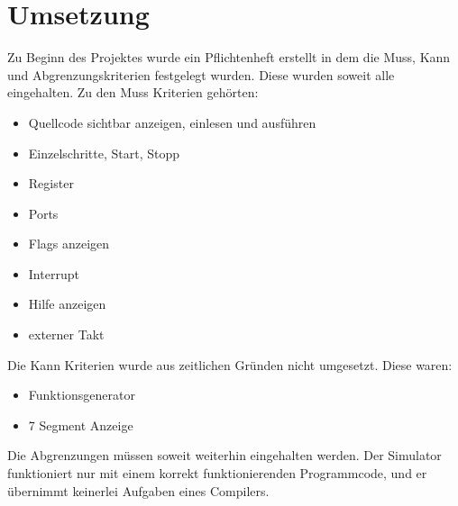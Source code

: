 \section{Umsetzung}
Zu Beginn des Projektes wurde ein Pflichtenheft erstellt in dem die Muss, Kann und Abgrenzungskriterien festgelegt wurden. Diese wurden soweit alle eingehalten. Zu den Muss Kriterien gehörten:
\begin{itemize}
\item Quellcode sichtbar anzeigen, einlesen und ausführen
\item Einzelschritte, Start, Stopp
\item Register
\item Ports
\item Flags anzeigen
\item Interrupt 
\item Hilfe anzeigen 
\item externer Takt 
\end{itemize}

\noindent Die Kann Kriterien wurde aus zeitlichen Gründen nicht umgesetzt. Diese waren:
\begin{itemize}
\item Funktionsgenerator 
\item 7 Segment Anzeige
\end{itemize}

\noindent Die Abgrenzungen müssen soweit weiterhin eingehalten werden. Der Simulator funktioniert nur mit einem korrekt funktionierenden Programmcode, und er übernimmt keinerlei Aufgaben eines Compilers.